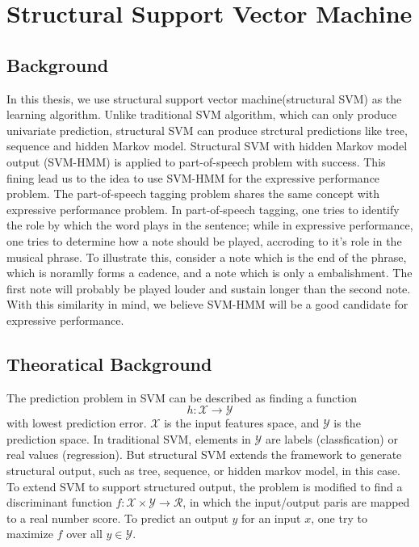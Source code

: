 \chapter{Structural Support Vector Machine}

\section{Background}
In this thesis, we use structural support vector machine(structural SVM) as the learning algorithm. Unlike traditional SVM algorithm, which can only produce univariate prediction, structural SVM can produce strctural predictions like tree, sequence and hidden Markov model. Structural SVM with hidden Markov model output (SVM-HMM) is applied to part-of-speech problem with success. This fining lead us to the idea to use SVM-HMM for the expressive performance problem. The part-of-speech tagging problem shares the same concept with expressive performance problem. In part-of-speech tagging, one tries to identify the role by which the word plays in the sentence; while in expressive performance,  one tries to determine how a note should be played, accroding to it's role in the musical phrase. To illustrate this, consider a note which is the end of the phrase, which is noramlly forms a cadence, and a note which is only a embalishment. The first note will probably be played louder and sustain longer than the second note. With this similarity in mind, we believe SVM-HMM will be a good candidate for expressive performance.

 \section{Theoratical Background}

 The prediction problem in SVM can be described  as finding a function 
 $$h: \mathcal{X \rightarrow Y}$$ with lowest prediction error. $\mathcal{X}$ is the input features space, and $\mathcal{Y}$ is the prediction space. In traditional SVM, elements in $\mathcal{Y}$ are labels (classfication) or real values (regression). But structural SVM extends the framework to generate structural output, such as tree, sequence, or hidden markov model, in this case.
 To extend SVM to support structured output, the problem is modified to find a discriminant function $f: \mathcal{X} \times \mathcal{Y} \rightarrow \mathcal{R}$, in which the input/output paris are mapped to a real number score. To predict an output $y$ for an input $x$, one try to maximize $f$ over all $y \in \mathcal{Y}$. 

